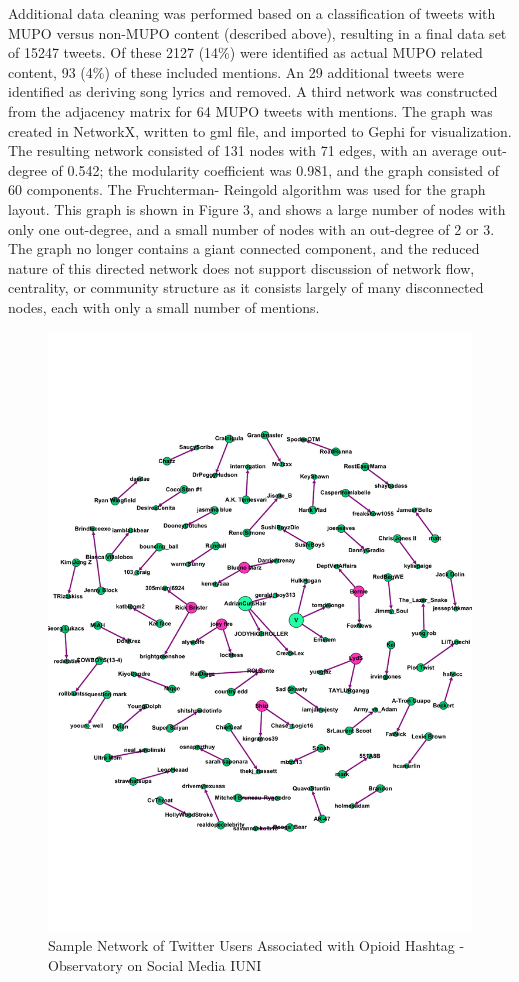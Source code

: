 \documentclass[sigconf]{acmart}
\begin{document}
Additional data cleaning was performed based on a classification of tweets
with MUPO versus non-MUPO content (described above), resulting in a final 
data set of 15247 tweets. Of these 2127 (14\%) were identified as actual 
MUPO related content, 93 (4\%) of these included mentions. An 29 additional
tweets were identified as deriving song lyrics and removed. A third network
was constructed from the adjacency matrix for 64 MUPO tweets with mentions. 
The graph was created in NetworkX, written to gml file, and imported to 
Gephi for visualization. The resulting network consisted of 131 nodes with
71 edges, with an average out-degree of 0.542; the modularity coefficient 
was 0.981, and the graph consisted of 60 components. The Fruchterman-
Reingold algorithm was used for the graph layout. This graph is shown in
Figure 3, and shows a large number of nodes with only one out-degree, and 
a small number of nodes with an out-degree of 2 or 3. The graph no longer
contains a giant connected component, and the reduced nature of this 
directed network does not support discussion of network flow, centrality, 
or community structure \cite{golbeck13, zafarani14} as it consists largely 
of many disconnected nodes, each with only a small number of mentions. 

\begin{figure}[!ht]
  \centering\includegraphics[width=\columnwidth]{images/Figure3.pdf}
  \caption{Sample Network of Twitter Users Associated with Opioid Hashtag - 
  Observatory on Social Media IUNI}
  \label{f:Figure3}
\end{figure}
\end{document}
